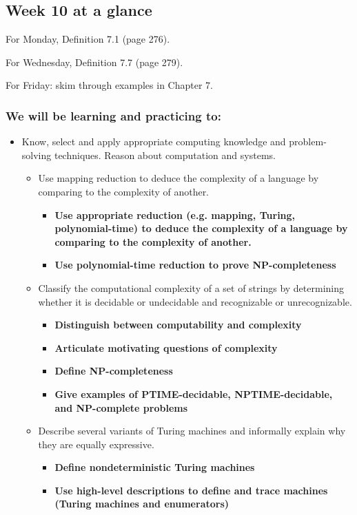 

\subsection*{Week 10 at a glance}

\vspace{-20pt}

For Monday, Definition 7.1 (page 276).

For Wednesday, Definition 7.7 (page 279).

For Friday:  skim through examples in Chapter 7.
\vspace{-20pt}

\subsubsection*{We will be learning and practicing to:}

\vspace{-20pt}

\begin{itemize}
    \item Know, select and apply appropriate computing knowledge and problem-solving techniques. Reason about computation and systems.
    \begin{itemize}
        \item Use mapping reduction to deduce the complexity of a language by comparing to the complexity of another.
        \begin{itemize}
         \item {\bf Use appropriate reduction (e.g. mapping, Turing, polynomial-time) to deduce the complexity of a language by comparing to the complexity of another.}
         \item {\bf Use polynomial-time reduction to prove NP-completeness}
       \end{itemize}
    \item Classify the computational complexity of a set of strings by determining whether it is decidable or undecidable and recognizable or unrecognizable.
    \begin{itemize}
        \item {\bf Distinguish between computability and complexity}
        \item {\bf Articulate motivating questions of complexity}
        \item {\bf Define NP-completeness}
        \item {\bf Give examples of PTIME-decidable, NPTIME-decidable, and NP-complete problems}
    \end{itemize}
   \item  Describe several variants of Turing machines and informally explain why they are equally expressive.
   \begin{itemize}
   \item {\bf Define nondeterministic Turing machines}
   \item {\bf Use high-level descriptions to define and trace machines (Turing machines and enumerators)}
   \end{itemize}
\end{itemize}
\end{itemize}

